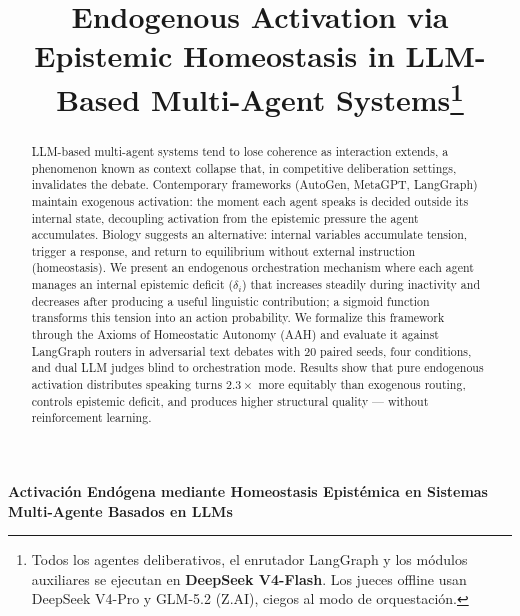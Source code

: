 \documentclass{llncs}
\begin{document}
\title{Endogenous Activation via Epistemic Homeostasis in
LLM-Based Multi-Agent Systems\thanks{Todos los agentes deliberativos,
el enrutador LangGraph y los m\'odulos auxiliares se ejecutan en
\textbf{DeepSeek V4-Flash}. Los jueces offline usan DeepSeek V4-Pro y
GLM-5.2 (Z.AI), ciegos al modo de orquestaci\'on.}}

\author{}
\institute{}

\maketitle

\begin{abstract}
LLM-based multi-agent systems tend to lose coherence as interaction
extends, a phenomenon known as context collapse that, in competitive
deliberation settings, invalidates the debate. Contemporary frameworks
(AutoGen, MetaGPT, LangGraph) maintain exogenous activation: the
moment each agent speaks is decided outside its internal state,
decoupling activation from the epistemic pressure the agent
accumulates. Biology suggests an alternative: internal variables
accumulate tension, trigger a response, and return to equilibrium
without external instruction (homeostasis). We present an endogenous
orchestration mechanism where each agent manages an internal epistemic
deficit ($\delta_i$) that increases steadily during inactivity and
decreases after producing a useful linguistic contribution; a sigmoid
function transforms this tension into an action probability. We
formalize this framework through the Axioms of Homeostatic Autonomy
(AAH) and evaluate it against LangGraph routers in adversarial text
debates with 20 paired seeds, four conditions, and dual LLM judges
blind to orchestration mode. Results show that pure endogenous
activation distributes speaking turns $2.3\times$ more equitably than
exogenous routing, controls epistemic deficit, and produces higher
structural quality --- without reinforcement learning.

\end{abstract}
\clearpage

\begin{center}
{\Large \bfseries\boldmath Activaci\'on End\'ogena mediante Homeostasis
Epist\'emica en Sistemas Multi-Agente Basados en LLMs}
\end{center}
\end{document}
